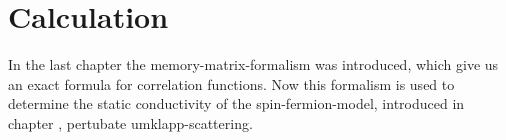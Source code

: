 \chapter{Calculation}
\label{ch:calculation}

In the last chapter the memory-matrix-formalism was introduced, which give us an exact formula for correlation functions.
Now this formalism is used to determine the static conductivity of the spin-fermion-model, introduced in chapter , pertubate umklapp-scattering.
